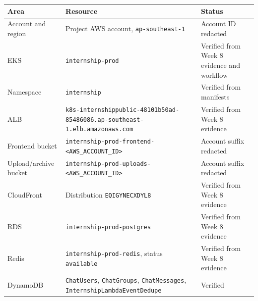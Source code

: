 {
\begingroup
\small
\setlength{\tabcolsep}{3pt}
\renewcommand{\arraystretch}{1.15}
\begin{longtable}{@{}
  >{\raggedright\arraybackslash}p{}
  >{\raggedright\arraybackslash}p{}
  >{\raggedright\arraybackslash}p{}@{}}
\toprule\noalign{}
\begin{minipage}[b]{\linewidth}\raggedright
Area
\end{minipage} & \begin{minipage}[b]{\linewidth}\raggedright
Resource
\end{minipage} & \begin{minipage}[b]{\linewidth}\raggedright
Status
\end{minipage} \\
\midrule\noalign{}
\endhead
\bottomrule\noalign{}
\endlastfoot
Account and region & Project AWS account, \texttt{ap-\allowbreak{}southeast-\allowbreak{}1} &
Account ID redacted \\
EKS & \texttt{internship-\allowbreak{}prod} & Verified from Week 8 evidence and
workflow \\
Namespace & \texttt{internship} & Verified from manifests \\
ALB &
\texttt{k8s-\allowbreak{}internshippublic-\allowbreak{}48101b50ad-\allowbreak{}85486086.\allowbreak{}ap-\allowbreak{}southeast-\allowbreak{}1.\allowbreak{}elb.\allowbreak{}amazonaws.\allowbreak{}com}
& Verified from Week 8 evidence \\
Frontend bucket &
\texttt{internship-\allowbreak{}prod-\allowbreak{}frontend-\textless{}AWS\_\allowbreak{}ACCOUNT\_\allowbreak{}ID\textgreater{}}
& Account suffix redacted \\
Upload/archive bucket &
\texttt{internship-\allowbreak{}prod-\allowbreak{}uploads-\textless{}AWS\_\allowbreak{}ACCOUNT\_\allowbreak{}ID\textgreater{}}
& Account suffix redacted \\
CloudFront & Distribution \texttt{EQIGYNECXDYL8} & Verified from Week 8
evidence \\
RDS & \texttt{internship-\allowbreak{}prod-\allowbreak{}postgres} & Verified from Week 8
evidence \\
Redis & \texttt{internship-\allowbreak{}prod-\allowbreak{}redis}, status \texttt{available} &
Verified from Week 8 evidence \\
DynamoDB & \texttt{ChatUsers}, \texttt{ChatGroups},
\texttt{ChatMessages}, \texttt{InternshipLambdaEventDedupe} & Verified

\end{longtable}}

